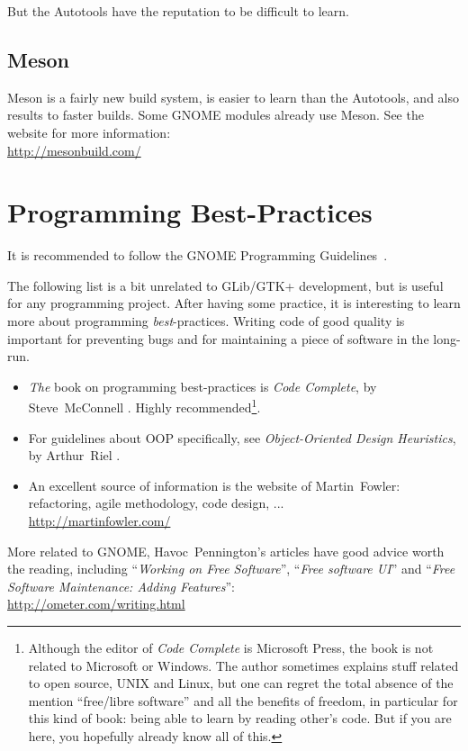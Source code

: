 But the Autotools have the reputation to be difficult to learn.

\subsection{Meson}

Meson is a fairly new build system, is easier to learn than the Autotools, and also results to faster builds. Some GNOME modules already use Meson. See the website for more information:\\
\url{http://mesonbuild.com/}

\section{Programming Best-Practices}

It is recommended to follow the GNOME Programming Guidelines~\cite{gnome-programming-guidelines}.

The following list is a bit unrelated to GLib/GTK+ development, but is useful for any programming project. After having some practice, it is interesting to learn more about programming \emph{best}-practices. Writing code of good quality is important for preventing bugs and for maintaining a piece of software in the long-run.

\begin{itemize}
  \item \emph{The} book on programming best-practices is \emph{Code Complete}, by Steve~McConnell \cite{code-complete}. Highly recommended\footnote{Although the editor of \emph{Code Complete} is Microsoft Press, the book is not related to Microsoft or Windows. The author sometimes explains stuff related to open source, UNIX and Linux, but one can regret the total absence of the mention ``free/libre software'' and all the benefits of freedom, in particular for this kind of book: being able to learn by reading other's code. But if you are here, you hopefully already know all of this.}.

  \item For guidelines about OOP specifically, see \emph{Object-Oriented Design Heuristics}, by Arthur~Riel \cite{oop-book}.

  \item An excellent source of information is the website of Martin~Fowler: refactoring, agile methodology, code design, ...\\
  \url{http://martinfowler.com/}
\end{itemize}

More related to GNOME, Havoc~Pennington's articles have good advice worth the reading, including ``\emph{Working on Free Software}'', ``\emph{Free software UI}'' and ``\emph{Free Software Maintenance: Adding Features}'':\\
\url{http://ometer.com/writing.html}
